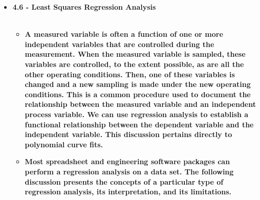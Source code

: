\documentclass[11pt]{article}
\begin{document}
\begin{itemize}



		
	\item \textbf{ \LARGE 4.6 -  Least Squares Regression Analysis} \\\\
	\begin{itemize}
		

		\item \textbf{ \Large A measured variable is often a function of one or more independent variables that are controlled during
the measurement. When the measured variable is sampled, these variables are controlled, to the extent possible, as are all the other operating conditions. Then, one of these variables is changed and a new sampling is made under the new operating conditions. This is a common procedure used to document the relationship between the measured variable and an independent process variable. We can use regression analysis to establish a functional relationship between the dependent variable and the
independent variable. This discussion pertains directly to polynomial curve fits.  } \\
	
\item \textbf{ \Large Most spreadsheet and engineering software packages can perform a regression analysis on a
data set. The following discussion presents the concepts of a particular type of regression analysis,
its interpretation, and its limitations.}\\
\newpage


\end{itemize}
\end{itemize}
\end{document}
